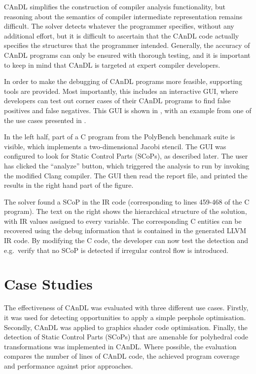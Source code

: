    CAnDL simplifies the construction of compiler analysis functionality, but
    reasoning about the semantics of compiler intermediate representation
    remains difficult.
    The solver detects whatever the programmer specifies, without any additional
    effort, but it is difficult to ascertain that the CAnDL code actually
    specifies the structures that the programmer intended.
    Generally, the accuracy of CAnDL programs can only be ensured with
    thorough testing, and it is important to keep in mind that CAnDL is targeted
    at expert compiler developers.

    In order to make the debugging of CAnDL programs more feasible, 
    supporting tools are provided.
    Most importantly, this includes an interactive GUI, where developers can
    test out corner cases of their CAnDL programs to find false positives and
    false negatives.
    This GUI is shown in , with an example from one of the use
    cases presented in .

    In the left half, part of a C program from the PolyBench benchmark suite
    is visible, which implements a two-dimensional Jacobi stencil.
    The GUI was configured to look for Static Control Parts (SCoPs), as
    described later.
    The user has clicked the ``analyze'' button, which triggered the analysis to
    run by invoking the modified Clang compiler.
    The GUI then read the report file, and printed the results in the right
    hand part of the figure.

    The solver found a SCoP in the IR code (corresponding to lines 459-468 of
    the C program).
    The text on the right shows the hierarchical structure of the solution, with
    IR values assigned to every variable.
    The corresponding C entities can be recovered using the debug
    information that is contained in the generated LLVM IR code.
    By modifying the C code, the developer can now test the detection and
    e.g.\ verify that no SCoP is detected if irregular control flow is
    introduced.

\section{Case Studies}
\label{sec:casestudies}

    The effectiveness of CAnDL was evaluated with three different use cases.
    Firstly, it was used for detecting opportunities to apply a simple peephole
    optimisation.
    Secondly, CAnDL was applied to graphics shader code optimisation.
    Finally, the detection of Static Control Parts (SCoPs) that are
    amenable for polyhedral code transformations was implemented in CAnDL.
    Where possible, the evaluation compares the number of lines of CAnDL code,
    the achieved program coverage and performance against prior approaches.

